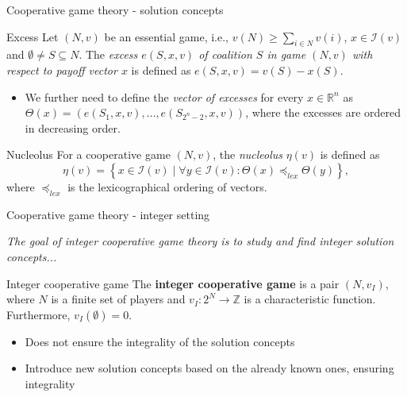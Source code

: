 \documentclass{beamer}
\newcommand{\Z}{\mathbb{Z}}
\begin{document}
\begin{frame}{Cooperative game theory - solution concepts}
    \pause

    \begin{block}{Excess}
            Let $(N,v)$ be an essential game, i.e., $v(N) \geq \sum_{i \in N}v(i)$, $x \in \mathcal{I}(v)$ and $\emptyset \neq S \subseteq N$.
            The \emph{excess $e(S,x,v)$ of coalition $S$ in game $(N,v)$ with respect to payoff vector $x$} is defined as $e(S,x,v) = v(S) - x(S)$.
    \end{block}

    \pause

    \begin{itemize}
        \item We further need to define the \emph{vector of excesses} for every $x \in \mathbb{R}^n$ as $\Theta(x)=\left(e(S_1,x,v), \dots, e(S_{2^{n}-2},x,v)\right)$, where the excesses are ordered in decreasing order.
    \end{itemize}

    \pause

    \begin{block}{Nucleolus}
        For a cooperative game $(N,v)$, the \emph{nucleolus} $\eta(v)$ is defined as
        \begin{displaymath}
            \eta(v) = \left\{ x \in \mathcal{I}(v) \mid \forall y \in \mathcal{I}(v): \Theta(x) \preceq_{lex} \Theta(y)\right\},
        \end{displaymath}
        where $\preceq_{lex}$ is the lexicographical ordering of vectors.
    \end{block}
\end{frame}



\begin{frame}{Cooperative game theory - integer setting}
    \pause

    \textit{The goal of integer cooperative game theory is to study and find integer solution concepts...}

    \pause

    \begin{block}{Integer cooperative game}
        The \textbf{integer cooperative game} is a pair $(N, v_I)$, where $N$ is a finite set of players and $v_I: 2^N \to \Z$ is a characteristic function.
        Furthermore, $v_I(\emptyset) = 0$.
    \end{block}

    \pause

    \begin{itemize}
        \item Does not ensure the integrality of the solution concepts
        \item Introduce new solution concepts based on the already known ones, ensuring integrality
    \end{itemize}

\end{frame}
\end{document}
